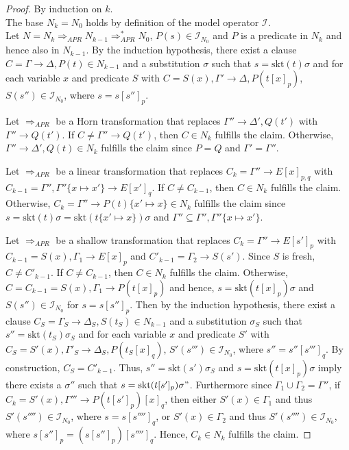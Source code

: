 \documentclass{llncs}
\newcommand{\imp}{\rightarrow}
\newcommand{\skt}{\text{skt}}
\newcommand{\apr}{ \Rightarrow_{APR}}
\newcommand{\I}[1]{\mathcal{I}_{#1}}
\begin{document}
\begin{proof}
By induction on $k$.\\
The base $N_k=N_0$ holds by definition of the model operator $\I{}$. \\
Let  $N = N_k\apr N_{k-1} \apr^* N_0$, $P(s) \in  \I{N_0}$ and $P$ is a predicate in $N_k$ and hence also in $N_{k-1}$. 
By the induction hypothesis, there exist a clause $C = \Gamma \imp \Delta,P(t) \in N_{k-1}$ and a substitution $\sigma$ such that
$s = \skt(t)\sigma$ and for each variable $x$ and predicate $S$ with $C = S(x),\Gamma' \imp \Delta,P(t[x]_p)$, $S(s'') \in \I{N_0}$, where $s=s[s'']_p$.

Let $\apr$ be a Horn transformation that replaces $\Gamma'' \imp \Delta',Q(t')$ with $\Gamma'' \imp Q(t')$.
If $C \neq \Gamma'' \imp Q(t')$, then $C \in N_k$ fulfills the claim.
Otherwise, $\Gamma'' \imp \Delta',Q(t) \in N_k$ fulfills the claim since $P=Q$ and $\Gamma' = \Gamma''$.

Let $\apr$ be a linear transformation that replaces $C_k = \Gamma'' \imp E[x]_{p,q}$ with $C_{k-1}=\Gamma'',\Gamma''\{x \mapsto x'\} \imp E[x']_{q}$.
If $C \neq C_{k-1}$, then $C \in N_k$ fulfills the claim.
Otherwise, $C_k=\Gamma'' \imp P(t)\{x' \mapsto x\} \in N_k$ fulfills the claim since $s = \skt(t)\sigma = \skt(t\{x' \mapsto x\})\sigma$ and $\Gamma'' \subseteq \Gamma'',\Gamma''\{x \mapsto x'\}$.

Let $\apr$ be a shallow transformation that replaces $C_k = \Gamma'' \imp E[s']_{p}$ with $C_{k-1}=S(x),\Gamma_1 \imp E[x]_p$ and $C'_{k-1}=\Gamma_2 \imp S(s')$.
Since $S$ is fresh, $C \neq C'_{k-1}$.
If $C \neq C_{k-1}$, then $C \in N_k$ fulfills the claim.
Otherwise, $C = C_{k-1} = S(x),\Gamma_1 \imp P(t[x]_p)$ and hence, $s = \skt(t[x]_p)\sigma$ and $S(s'')\in \I{N_0}$ for $s=s[s'']_p$.
Then by the induction hypothesis, there exist a clause $C_S = \Gamma_S \imp \Delta_S,S(t_S) \in N_{k-1}$ and a substitution $\sigma_S$ such that
$s'' = \skt(t_S)\sigma_S$ and for each variable $x$ and predicate $S'$ with $C_S = S'(x),\Gamma'_S \imp \Delta_S,P(t_S[x]_q)$, $S'(s''') \in \I{N_0}$, where $s''=s''[s''']_q$.
By construction, $C_S = C'_{k-1}$. 
Thus,  $s''= \skt(s')\sigma_S$ and $s = \skt(t[x]_p)\sigma$ imply there exists a $\sigma''$ such that $s =  \skt(t[s']_p)\sigma"$.
Furthermore since $\Gamma_1 \cup \Gamma_2 = \Gamma''$, if $C_k= S'(x),\Gamma''' \imp P(t[s']_{p})[x]_q$, then 
either $S'(x) \in \Gamma_1$ and thus  $S'(s'''') \in \I{N_0}$, where $s=s[s'''']_q$, or 
$S'(x) \in \Gamma_2$ and thus  $S'(s'''') \in \I{N_0}$, where $s[s'']_p=(s[s'']_p)[s'''']_q$.
Hence, $C_k \in N_k$  fulfills the claim.
\end{proof}
\end{document}
